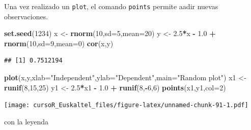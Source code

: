 \documentclass[]{book}
\newenvironment{Shaded}{\begin{snugshade}}{\end{snugshade}}
\newcommand{\KeywordTok}[1]{\textcolor[rgb]{0.13,0.29,0.53}{\textbf{#1}}}
\newcommand{\DataTypeTok}[1]{\textcolor[rgb]{0.13,0.29,0.53}{#1}}
\newcommand{\DecValTok}[1]{\textcolor[rgb]{0.00,0.00,0.81}{#1}}
\newcommand{\FloatTok}[1]{\textcolor[rgb]{0.00,0.00,0.81}{#1}}
\newcommand{\StringTok}[1]{\textcolor[rgb]{0.31,0.60,0.02}{#1}}
\newcommand{\OperatorTok}[1]{\textcolor[rgb]{0.81,0.36,0.00}{\textbf{#1}}}
\newcommand{\NormalTok}[1]{#1}
\begin{document}
Una vez realizado un \texttt{plot}, el comando \texttt{points} permite
aadir nuevas observaciones.

\begin{Shaded}
\begin{Highlighting}[]
\KeywordTok{set.seed}\NormalTok{(}\DecValTok{1234}\NormalTok{)}
\NormalTok{ x <-}\StringTok{ }\KeywordTok{rnorm}\NormalTok{(}\DecValTok{10}\NormalTok{,}\DataTypeTok{sd=}\DecValTok{5}\NormalTok{,}\DataTypeTok{mean=}\DecValTok{20}\NormalTok{)}
\NormalTok{ y <-}\StringTok{ }\FloatTok{2.5}\OperatorTok{*}\NormalTok{x }\OperatorTok{-}\StringTok{ }\FloatTok{1.0} \OperatorTok{+}\StringTok{ }\KeywordTok{rnorm}\NormalTok{(}\DecValTok{10}\NormalTok{,}\DataTypeTok{sd=}\DecValTok{9}\NormalTok{,}\DataTypeTok{mean=}\DecValTok{0}\NormalTok{)}
 \KeywordTok{cor}\NormalTok{(x,y)}
\end{Highlighting}
\end{Shaded}

\begin{verbatim}
## [1] 0.7512194
\end{verbatim}

\begin{Shaded}
\begin{Highlighting}[]
 \KeywordTok{plot}\NormalTok{(x,y,}\DataTypeTok{xlab=}\StringTok{"Independent"}\NormalTok{,}\DataTypeTok{ylab=}\StringTok{"Dependent"}\NormalTok{,}\DataTypeTok{main=}\StringTok{"Random plot"}\NormalTok{)}
\NormalTok{ x1 <-}\StringTok{ }\KeywordTok{runif}\NormalTok{(}\DecValTok{8}\NormalTok{,}\DecValTok{15}\NormalTok{,}\DecValTok{25}\NormalTok{)}
\NormalTok{ y1 <-}\StringTok{ }\FloatTok{2.5}\OperatorTok{*}\NormalTok{x1 }\OperatorTok{-}\StringTok{ }\FloatTok{1.0} \OperatorTok{+}\StringTok{ }\KeywordTok{runif}\NormalTok{(}\DecValTok{8}\NormalTok{,}\OperatorTok{-}\DecValTok{6}\NormalTok{,}\DecValTok{6}\NormalTok{)}
 \KeywordTok{points}\NormalTok{(x1,y1,}\DataTypeTok{col=}\DecValTok{2}\NormalTok{)}
\end{Highlighting}
\end{Shaded}

\texttt{[image: cursoR\_Euskaltel\_files/figure-latex/unnamed-chunk-91-1.pdf]}

con la leyenda
\end{document}
